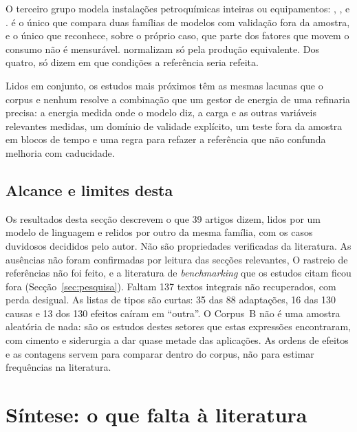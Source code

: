 O terceiro grupo modela instalações petroquímicas inteiras ou equipamentos:
\textcite{Hamedi2019}, \textcite{Ochoa2017}, \textcite{Morales2018} e
\textcite{Beisheim2020}. \textcite{Hamedi2019} é o único que compara duas
famílias de modelos com validação fora da amostra, e o único que reconhece,
sobre o próprio caso, que parte dos fatores que movem o consumo não é
mensurável. \textcite{Ochoa2017} normalizam só pela produção equivalente. Dos quatro,
só \textcite{Beisheim2020} dizem em que condições a referência seria
refeita.

Lidos em conjunto, os estudos mais próximos têm as mesmas lacunas que o
corpus e nenhum resolve a combinação que um gestor de energia de uma
refinaria precisa: a energia medida onde o modelo diz, a carga e as outras
variáveis relevantes medidas, um domínio de validade explícito, um teste
fora da amostra em blocos de tempo e uma regra para refazer a referência que
não confunda melhoria com caducidade.

\subsection{Alcance e limites desta }

Os resultados desta secção descrevem o que 39 artigos dizem, lidos por um
modelo de linguagem e relidos por outro da mesma família, com os casos
duvidosos decididos pelo autor. Não são propriedades verificadas da
literatura. As ausências não foram confirmadas por leitura das secções
relevantes,  O rastreio de referências não foi feito, e a
literatura de \emph{benchmarking} que os estudos citam ficou fora
(Secção~\ref{sec:pesquisa}). Faltam 137 textos integrais não recuperados, com
perda desigual. As listas de tipos são curtas: 35 das 88 adaptações, 16 das
130 causas e 13 dos 130 efeitos caíram em ``outra''. O Corpus~B não é uma
amostra aleatória de nada: são os estudos destes setores que estas expressões
encontraram, com cimento e siderurgia a dar quase metade das aplicações. As
ordens de efeitos e as contagens servem para comparar dentro do corpus, não
para estimar frequências na literatura.

\section{Síntese: o que falta à literatura}
\label{sec:gap}

